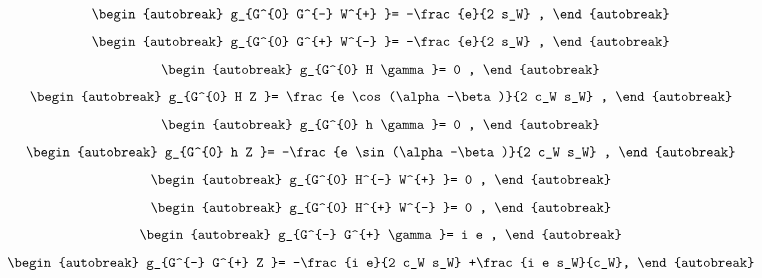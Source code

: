 \begin{align}
\begin{autobreak}
g_{G^{0} G^{-} W^{+} }=
	-\frac{e}{2 s_W}
	,
\end{autobreak}
\end{align}
\begin{align}
\begin{autobreak}
g_{G^{0} G^{+} W^{-} }=
	-\frac{e}{2 s_W}
	,
\end{autobreak}
\end{align}
\begin{align}
\begin{autobreak}
g_{G^{0} H \gamma }=
	0
	,
\end{autobreak}
\end{align}
\begin{align}
\begin{autobreak}
g_{G^{0} H Z }=
	\frac{e \cos (\alpha -\beta )}{2 c_W s_W}
	,
\end{autobreak}
\end{align}
\begin{align}
\begin{autobreak}
g_{G^{0} h \gamma }=
	0
	,
\end{autobreak}
\end{align}
\begin{align}
\begin{autobreak}
g_{G^{0} h Z }=
	-\frac{e \sin (\alpha -\beta )}{2 c_W s_W}
	,
\end{autobreak}
\end{align}
\begin{align}
\begin{autobreak}
g_{G^{0} H^{-} W^{+} }=
	0
	,
\end{autobreak}
\end{align}
\begin{align}
\begin{autobreak}
g_{G^{0} H^{+} W^{-} }=
	0
	,
\end{autobreak}
\end{align}
\begin{align}
\begin{autobreak}
g_{G^{-} G^{+} \gamma }=
	i e
	,
\end{autobreak}
\end{align}
\begin{align}
\begin{autobreak}
g_{G^{-} G^{+} Z }=
	-\frac{i e}{2 c_W s_W}
	+\frac{i e s_W}{c_W},
\end{autobreak}
\end{align}
